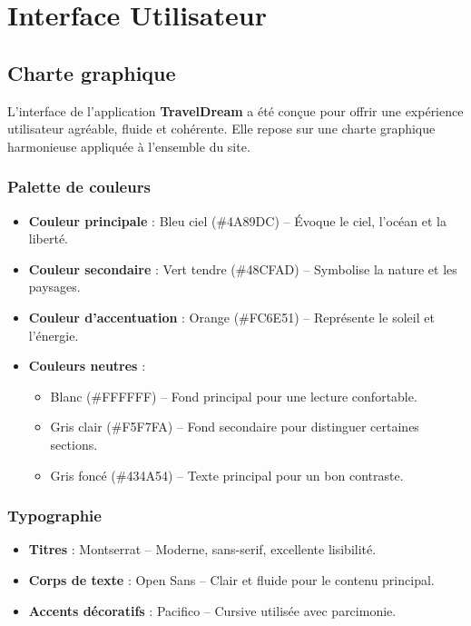 \documentclass[a4paper,12pt]{article}
\begin{document}
\section{Interface Utilisateur}

\subsection{Charte graphique}
L’interface de l’application \textbf{TravelDream} a été conçue pour offrir une expérience utilisateur agréable, fluide et cohérente. Elle repose sur une charte graphique harmonieuse appliquée à l’ensemble du site.

\subsubsection{Palette de couleurs}
\begin{itemize}
  \item \textbf{Couleur principale} : Bleu ciel (\#4A89DC) – Évoque le ciel, l’océan et la liberté.
  \item \textbf{Couleur secondaire} : Vert tendre (\#48CFAD) – Symbolise la nature et les paysages.
  \item \textbf{Couleur d’accentuation} : Orange (\#FC6E51) – Représente le soleil et l’énergie.
  \item \textbf{Couleurs neutres} : 
  \begin{itemize}
    \item Blanc (\#FFFFFF) – Fond principal pour une lecture confortable.
    \item Gris clair (\#F5F7FA) – Fond secondaire pour distinguer certaines sections.
    \item Gris foncé (\#434A54) – Texte principal pour un bon contraste.
  \end{itemize}
\end{itemize}

\subsubsection{Typographie}
\begin{itemize}
  \item \textbf{Titres} : Montserrat – Moderne, sans-serif, excellente lisibilité.
  \item \textbf{Corps de texte} : Open Sans – Clair et fluide pour le contenu principal.
  \item \textbf{Accents décoratifs} : Pacifico – Cursive utilisée avec parcimonie.
\end{itemize}
\end{document}
